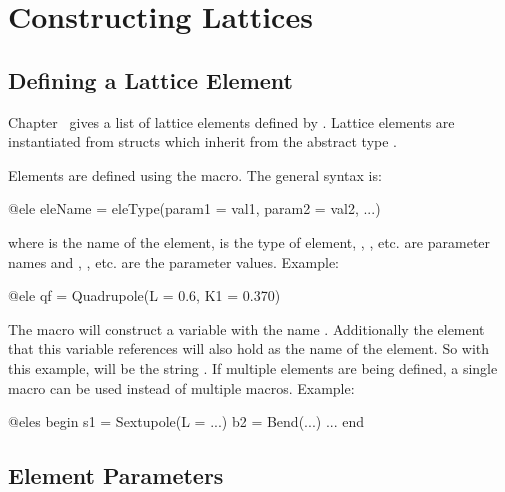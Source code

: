 \chapter{Constructing Lattices}
\label{c:construct-lat}

\section{Defining a Lattice Element}
\label{s:ele.def}

Chapter~ gives a list of lattice elements defined by \accellat. 
Lattice elements are instantiated from structs which inherit from the abstract type .

Elements are defined using the  macro. The general syntax is:
\begin{example}
  @ele eleName = eleType(param1 = val1, param2 = val2, ...)
\end{example}
where  is the name of the element,  is the type of element, , ,
etc. are parameter names and , , etc. are the parameter values.
Example:
\begin{example}
  @ele qf = Quadrupole(L = 0.6, K1 = 0.370)
\end{example}
The  macro will construct a \julia variable with the name . Additionally the element
that this variable references will also hold  as the name of the element. So with this
example,  will be the string . If multiple elements are being defined, a single
 macro can be used instead of multiple  macros. Example:
\begin{example}
  @eles begin
    s1 = Sextupole(L = ...)
    b2 = Bend(...)
    ...
  end
\end{example}

\section{Element Parameters}
\label{s:ele.type}

